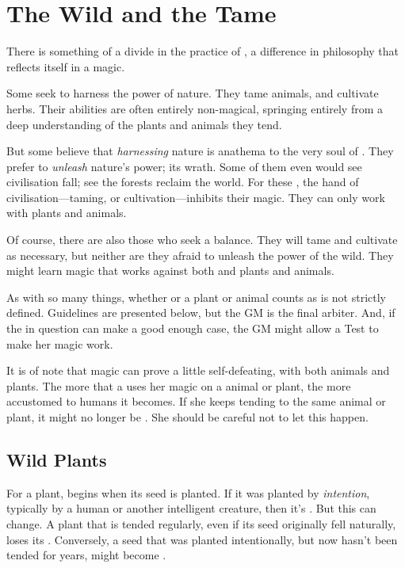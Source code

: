 
\section{The Wild and the Tame}

There is something of a divide in the practice of , a difference in philosophy that reflects itself in a  magic.

Some  seek to harness the power of nature.
They tame animals, and cultivate herbs.
Their abilities are often entirely non-magical, springing entirely from a deep understanding of the plants and animals they tend.

But some believe that \emph{harnessing} nature is anathema to the very soul of .
They prefer to \emph{unleash} nature's power; its wrath.
Some of them even would see civilisation fall; see the forests reclaim the world.
For these , the hand of civilisation---taming, or cultivation---inhibits their magic.
They can only work with {\wild} plants and animals.

Of course, there are also those  who seek a balance.
They will tame and cultivate as necessary, but neither are they afraid to unleash the power of the wild.
They might learn magic that works against both {\wild} and {\nonwild} plants and animals.

As with so many things, whether or a plant or animal counts as {\wild} is not strictly defined.
Guidelines are presented below, but the GM is the final arbiter.
And, if the  in question can make a good enough case, the GM might allow a Test to make her magic work.

It is of note that {\wild} magic can prove a little self-defeating, with both animals and plants.
The more that a  uses her magic on a {\wild} animal or plant, the more accustomed to humans it becomes.
If she keeps tending to the same animal or plant, it might no longer be {\wild}.
She should be careful not to let this happen.

\subsection{Wild Plants}

For a plant, {\wildness} begins when its seed is planted.
If it was planted by \emph{intention}, typically by a human or another intelligent creature, then it's {\nonwild}.
But this can change.
A plant that is tended regularly, even if its seed originally fell naturally, loses its {\wildness}.
Conversely, a seed that was planted intentionally, but now hasn't been tended for years, might become {\wild}.


